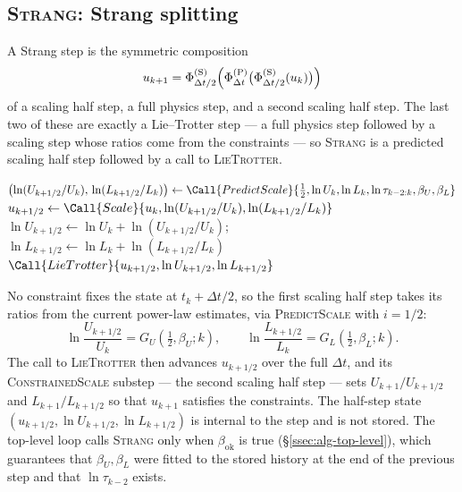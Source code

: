 \subsection{\textsc{Strang}: Strang splitting}\label{ssec:alg-strang}
A Strang step is the symmetric composition
\begin{equation}\label{eq:alg-strang-composition}
  u_{k+1} = \Phi_{\Delta t/2}^{(\mathrm{S})}\Bigl(\Phi_{\Delta t}^{(\mathrm{P})}\bigl(\Phi_{\Delta t/2}^{(\mathrm{S})}(u_k)\bigr)\Bigr)
\end{equation}
of a scaling half step, a full physics step, and a second scaling half step.
The last two of these are exactly a Lie--Trotter step --- a full physics step
followed by a scaling step whose ratios come from the constraints --- so
\textsc{Strang} is a predicted scaling half step followed by a call to
\textsc{LieTrotter}.
\begin{algorithm}[H]
\caption{Strang step}
\begin{algorithmic}[1]
  \State $\bigl(\ln (U_{k+1/2}/U_k),\, \ln (L_{k+1/2}/L_k)\bigr) \gets \Call{PredictScale}{\tfrac12, \ln U_k, \ln L_k, \ln \tau_{k-2:k}, \beta_U, \beta_L}$ \Comment{\eqref{eq:alg-strang-predict}}
  \State $u_{k+1/2} \gets \Call{Scale}{u_k, \ln (U_{k+1/2}/U_k), \ln (L_{k+1/2}/L_k)}$
  \State $\ln U_{k+1/2} \gets \ln U_k + \ln (U_{k+1/2}/U_k)$;\ \ $\ln L_{k+1/2} \gets \ln L_k + \ln (L_{k+1/2}/L_k)$
  \State \Return $\Call{LieTrotter}{u_{k+1/2}, \ln U_{k+1/2}, \ln L_{k+1/2}}$ \Comment{\S\ref{ssec:alg-lie-trotter}}
\EndFunction
\end{algorithmic}
\end{algorithm}
No constraint fixes the state at $t_k + \Delta t/2$, so the first scaling half
step takes its ratios from the current power-law estimates, via
\textsc{PredictScale} with $i = 1/2$:
\begin{equation}\label{eq:alg-strang-predict}
  \ln\frac{U_{k+1/2}}{U_k} = G_U\!\left(\tfrac12, \beta_U; k\right), \qquad
  \ln\frac{L_{k+1/2}}{L_k} = G_L\!\left(\tfrac12, \beta_L; k\right).
\end{equation}
The call to \textsc{LieTrotter} then advances $u_{k+1/2}$ over the full
$\Delta t$, and its \textsc{ConstrainedScale} substep --- the second scaling
half step --- sets $U_{k+1}/U_{k+1/2}$ and $L_{k+1}/L_{k+1/2}$ so that
$u_{k+1}$ satisfies the constraints. The half-step state
$(u_{k+1/2}, \ln U_{k+1/2}, \ln L_{k+1/2})$ is internal to the step and is not
stored. The top-level loop calls \textsc{Strang} only when
$\beta_{\mathrm{ok}}$ is true (\S\ref{ssec:alg-top-level}), which guarantees
that $\beta_U, \beta_L$ were fitted to the stored history at the end of the
previous step and that $\ln \tau_{k-2}$ exists.

